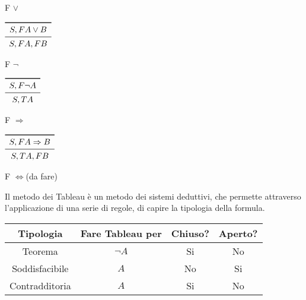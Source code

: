 F $\lor$

$\begin{array}{c}
\toprule
S,F A \lor B \\
\midrule
S, FA, FB \\
\end{array}$

F $\neg$

$\begin{array}{c}
\toprule
S,F \neg A \\
\midrule
S, TA \\
\end{array}$

F $\Rightarrow$

$\begin{array}{c}
\toprule
S,F A \Rightarrow B \\
\midrule
S, TA, FB \\
\end{array}$

F $\iff$(da fare)

Il metodo dei Tableau è un metodo dei sistemi deduttivi, che permette attraverso
l'applicazione di una serie di regole, di capire la tipologia della formula.
\begin{tabular}{cccc}
\toprule Tipologia & Fare Tableau per & Chiuso? & Aperto? \\
\midrule
         Teorema & $\neg A$ & Si & No \\
         Soddisfacibile & $A$ & No & Si \\
         Contradditoria & $A$ & Si & No \\
\bottomrule
\end{tabular}

